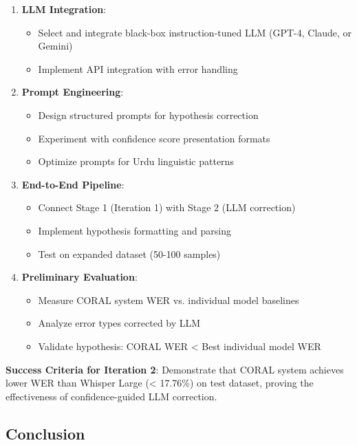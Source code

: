 \begin{enumerate}
    \item \textbf{LLM Integration}:
    \begin{itemize}
        \item Select and integrate black-box instruction-tuned LLM (GPT-4, Claude, or Gemini)
        \item Implement API integration with error handling
    \end{itemize}
    
    \item \textbf{Prompt Engineering}:
    \begin{itemize}
        \item Design structured prompts for hypothesis correction
        \item Experiment with confidence score presentation formats
        \item Optimize prompts for Urdu linguistic patterns
    \end{itemize}
    
    \item \textbf{End-to-End Pipeline}:
    \begin{itemize}
        \item Connect Stage 1 (Iteration 1) with Stage 2 (LLM correction)
        \item Implement hypothesis formatting and parsing
        \item Test on expanded dataset (50-100 samples)
    \end{itemize}
    
    \item \textbf{Preliminary Evaluation}:
    \begin{itemize}
        \item Measure CORAL system WER vs. individual model baselines
        \item Analyze error types corrected by LLM
        \item Validate hypothesis: CORAL WER < Best individual model WER
    \end{itemize}
\end{enumerate}

\textbf{Success Criteria for Iteration 2}: Demonstrate that CORAL system achieves lower WER than Whisper Large (< 17.76\%) on test dataset, proving the effectiveness of confidence-guided LLM correction.

\subsection{Conclusion}

